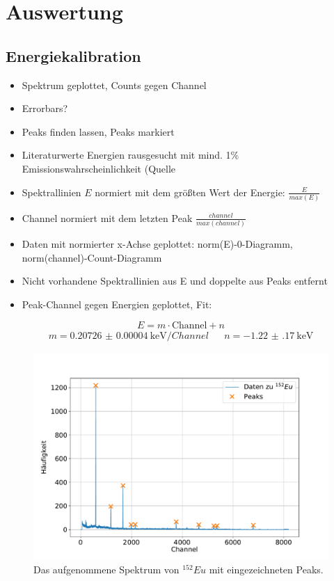 \section{Auswertung}
\subsection{Energiekalibration}
\begin{itemize}
	\item Spektrum geplottet, Counts gegen Channel
	\item Errorbars?
	\item Peaks finden lassen, Peaks markiert
	\item Literaturwerte Energien rausgesucht mit mind. 1\% Emissionswahrscheinlichkeit (Quelle %
	\item Spektrallinien $E$ normiert mit dem größten Wert der Energie: $\frac{E}{max(E)}$
	\item Channel normiert mit dem letzten Peak $\frac{channel}{max(channel)}$
	\item Daten mit normierter x-Achse geplottet: norm(E)-0-Diagramm, norm(channel)-Count-Diagramm
	\item Nicht vorhandene Spektrallinien aus E und doppelte aus Peaks entfernt
	\item Peak-Channel gegen Energien geplottet, Fit:
\end{itemize}
\begin{equation*}
	E = m \cdot \text{Channel} + n
\end{equation*}
\begin{align*}
	m = \SI{0.20726(4)}{\kilo \electronvolt \per Channel} && n = \SI{-1.22(17)}{\kilo \electronvolt}
\end{align*}



\begin{figure}[h!]
  \centering
  \includegraphics[width=\textwidth]{content/images/spektrum_europium.pdf}
  \caption{Das aufgenommene Spektrum von $^{152}Eu$ mit eingezeichneten Peaks.}
  \label{fig:eu_spect}
\end{figure}

